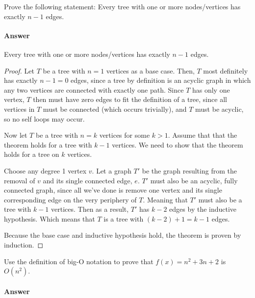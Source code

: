 \documentclass{article}
\begin{document}
\nextprob
Prove the following statement: Every tree with one or more nodes/vertices has
exactly $n-1$ edges.

\paragraph{Answer}

\begin{theorem} Every tree with one or more nodes/vertices has
exactly $n-1$ edges.
\end{theorem}
\begin{proof}
	Let $T$ be a tree with $n=1$ vertices as a base case. Then, $T$ most definitely has exactly $n-1=0$ 
	edges, since a tree by definition is an acyclic graph in which any two vertices are connected with exactly one path.
	Since $T$ has only one vertex, $T$ then must have zero edges to fit the definition of a tree, since all 
	vertices in $T$ must be connected (which occurs trivially), and $T$ must be acyclic, so no self loops may occur.

	Now let $T$ be a tree with $n=k$ vertices for some $k>1$. Assume that that the theorem holds for a tree with $k-1$ vertices.
	We need to show that the theorem holds for a tree on $k$ vertices.

	Choose any degree 1 vertex $v$. Let a graph $T'$ be the graph resulting from the removal of $v$ and its single connected
	edge, $e$. $T'$ must also be an acyclic, fully connected graph, since all we've done is remove one vertex and its single
	corresponding edge on the very periphery of $T$. Meaning that $T'$ must also be a tree with $k-1$ vertices. Then as a 
	result, $T'$ has $k-2$ edges by the inductive hypothesis. Which means that $T$ is a tree with $(k-2) + 1 = k - 1$ edges. 
	
	Because the base case and inductive hypothesis hold, the theorem is proven by induction.


\end{proof}




\nextprob
Use the definition of big-O notation to prove that $f(x)=n^2 + 3n +2$ is
$O(n^2)$.

\paragraph{Answer}
\end{document}
